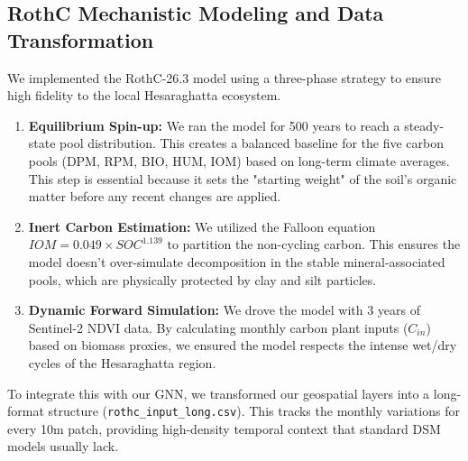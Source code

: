 \documentclass[conference]{IEEEtran}
\begin{document}
\subsection{RothC Mechanistic Modeling and Data Transformation}
We implemented the RothC-26.3 model using a three-phase strategy to ensure high fidelity to the local Hesaraghatta ecosystem.
\begin{enumerate}
    \item \textbf{Equilibrium Spin-up:} We ran the model for 500 years to reach a steady-state pool distribution. This creates a balanced baseline for the five carbon pools (DPM, RPM, BIO, HUM, IOM) based on long-term climate averages. This step is essential because it sets the "starting weight" of the soil’s organic matter before any recent changes are applied.
    \item \textbf{Inert Carbon Estimation:} We utilized the Falloon equation $IOM = 0.049 \times SOC^{1.139}$ to partition the non-cycling carbon. This ensures the model doesn't over-simulate decomposition in the stable mineral-associated pools, which are physically protected by clay and silt particles.
    \item \textbf{Dynamic Forward Simulation:} We drove the model with 3 years of Sentinel-2 NDVI data. By calculating monthly carbon plant inputs ($C_{in}$) based on biomass proxies, we ensured the model respects the intense wet/dry cycles of the Hesaraghatta region.
\end{enumerate}
To integrate this with our GNN, we transformed our geospatial layers into a long-format structure (\texttt{rothc\_input\_long.csv}). This tracks the monthly variations for every 10m patch, providing high-density temporal context that standard DSM models usually lack.
\end{document}
